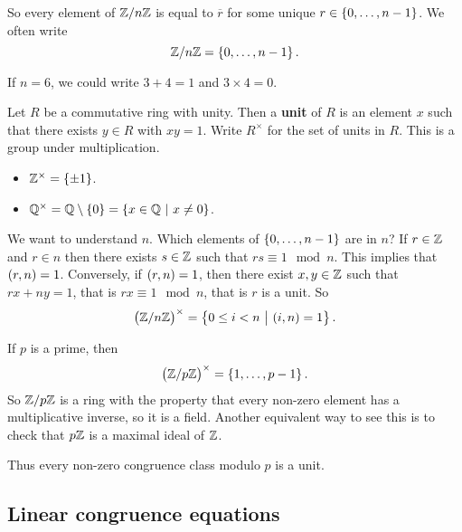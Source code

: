 So every element of $ \mathbb{Z} / n\mathbb{Z} $ is equal to $ \overline{r} $ for some unique $ r \in \cbr{0, \dots, n - 1} $. We often write
$$ \ZZ / n\ZZ = \cbr{0, \dots, n - 1}. $$

\begin{example*}
If $ n = 6 $, we could write $ 3 + 4 = 1 $ and $ 3 \times 4 = 0 $.
\end{example*}

Let $ R $ be a commutative ring with unity. Then a \textbf{unit} of $ R $ is an element $ x $ such that there exists $ y \in R $ with $ xy = 1 $. Write $ R^\times $ for the set of units in $ R $. This is a group under multiplication.

\begin{example*}
\hfill
\begin{itemize}
\item $ \ZZ^\times = \cbr{\pm 1} $.
\item $ \QQ^\times = \QQ \setminus \cbr{0} = \cbr{x \in \QQ \st x \ne 0} $.
\end{itemize}
\end{example*}

We want to understand $ \unit{n} $. Which elements of $ \cbr{0, \dots, n - 1} $ are in $ \unit{n} $? If $ r \in \mathbb{Z} $ and $ r \in \unit{n} $ then there exists $ s \in \mathbb{Z} $ such that $ rs \equiv 1 \mod n $. This implies that $ \br{r, n} = 1 $. Conversely, if $ \br{r, n} = 1 $, then there exist $ x, y \in \mathbb{Z} $ such that $ rx + ny = 1 $, that is $ rx \equiv 1 \mod n $, that is $ r $ is a unit. So
$$ \unit{n} = \cbr{0 \le i < n \st \br{i, n} = 1}. $$

\begin{example*}
If $ p $ is a prime, then
$$ \unit{p} = \cbr{1, \dots, p - 1}. $$
So $ \mathbb{Z} / p\mathbb{Z} $ is a ring with the property that every non-zero element has a multiplicative inverse, so it is a field. Another equivalent way to see this is to check that $ p\mathbb{Z} $ is a maximal ideal of $ \mathbb{Z} $.
\end{example*}

Thus every non-zero congruence class modulo $ p $ is a unit.

\pagebreak

\subsection{Linear congruence equations}


